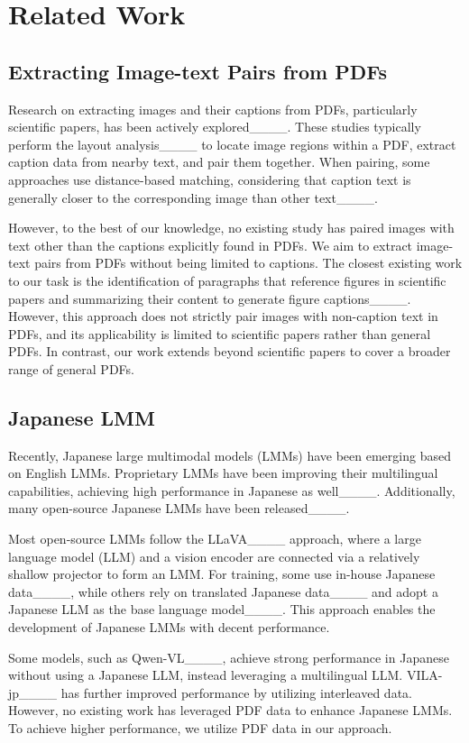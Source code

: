 \section{Related Work}
\subsection{Extracting Image-text Pairs from PDFs}
Research on extracting images and their captions from PDFs, particularly scientific papers, has been actively explored____.
These studies typically perform the layout analysis____ to locate image regions within a PDF, extract caption data from nearby text, and pair them together.
When pairing, some approaches use distance-based matching, considering that caption text is generally closer to the corresponding image than other text____.

However, to the best of our knowledge, no existing study has paired images with text other than the captions explicitly found in PDFs.
We aim to extract image-text pairs from PDFs without being limited to captions.
The closest existing work to our task is the identification of paragraphs that reference figures in scientific papers and summarizing their content to generate figure captions____.
However, this approach does not strictly pair images with non-caption text in PDFs, and its applicability is limited to scientific papers rather than general PDFs.
In contrast, our work extends beyond scientific papers to cover a broader range of general PDFs.


\subsection{Japanese LMM}\label{subsec:relatedwork-JA-LMM}
Recently, Japanese large multimodal models (LMMs) have been emerging based on English LMMs.
Proprietary LMMs have been improving their multilingual capabilities, achieving high performance in Japanese as well____.
Additionally, many open-source Japanese LMMs have been released____.

Most open-source LMMs follow the LLaVA____ approach, where a large language model (LLM) and a vision encoder are connected via a relatively shallow projector to form an LMM.
For training, some use in-house Japanese data____, while others rely on translated Japanese data____ and adopt a Japanese LLM as the base language model____.
This approach enables the development of Japanese LMMs with decent performance.

Some models, such as Qwen-VL____, achieve strong performance in Japanese without using a Japanese LLM, instead leveraging a multilingual LLM.
VILA-jp____ has further improved performance by utilizing interleaved data.
However, no existing work has leveraged PDF data to enhance Japanese LMMs.
To achieve higher performance, we utilize PDF data in our approach.